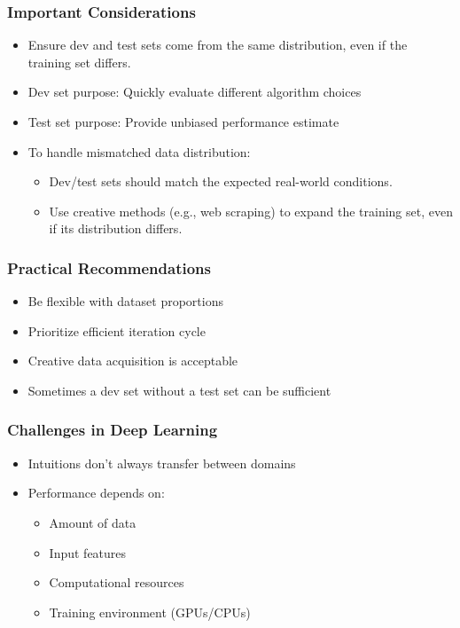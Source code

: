 \documentclass[letterpaper,12pt,notitlepage,twoside]{report}
\begin{document}
\subsubsection{Important Considerations}
\begin{itemize}[leftmargin=*,  nosep]
    \item Ensure dev and test sets come from the same distribution, even if the training set differs.
    \item Dev set purpose: Quickly evaluate different algorithm choices
    \item Test set purpose: Provide unbiased performance estimate
    \item To handle mismatched data distribution:
        \begin{itemize}[nosep]
            \item Dev/test sets should match the expected real-world conditions.
            \item Use creative methods (e.g., web scraping) to expand the training set, even if its distribution differs.
        \end{itemize}
\end{itemize}

\subsubsection{Practical Recommendations}
\begin{itemize}[leftmargin=*,  nosep]
    \item Be flexible with dataset proportions
    \item Prioritize efficient iteration cycle
    \item Creative data acquisition is acceptable
    \item Sometimes a dev set without a test set can be sufficient
\end{itemize}

\subsubsection{Challenges in Deep Learning}
\begin{itemize}[leftmargin=*,  nosep]
    \item Intuitions don't always transfer between domains
    \item Performance depends on:
    \begin{itemize}[nosep]
        \item Amount of data
        \item Input features
        \item Computational resources
        \item Training environment (GPUs/CPUs)
    \end{itemize}
\end{itemize}
\end{document}
